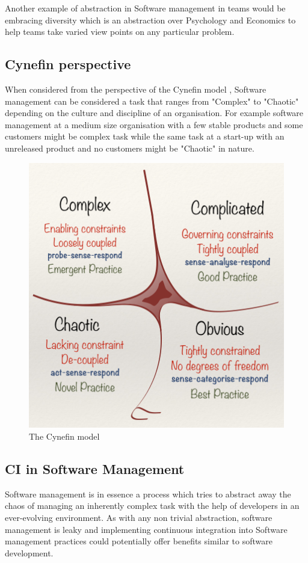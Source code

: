 \documentclass[12pt,conference]{IEEEtran}
\begin{document}
Another example of abstraction in Software management in teams would be embracing diversity which is an abstraction over Psychology and Economics to help teams take varied view points on any particular problem. 

\subsection*{Cynefin perspective}

When considered from the perspective of the Cynefin model \cite{snowden_cynefin_????}, Software management can be considered a task that ranges from "Complex" to "Chaotic" depending on the culture and discipline of an organisation. For example software management at a medium size organisation with a few stable products and some customers might be complex task while the same task at a start-up with an unreleased product and no customers might be "Chaotic" in nature.

\begin{figure}[hbtp]
\includegraphics[scale=0.6]{cynefin.png}
\caption{The Cynefin model}
\end{figure}

\subsection*{CI in Software Management}

Software management is in essence a process which tries to abstract away the chaos of managing an inherently complex task with the help of developers in an ever-evolving environment. As with any non trivial abstraction, software management is leaky and implementing continuous integration into Software management practices could potentially offer benefits similar to software development.
\end{document}
